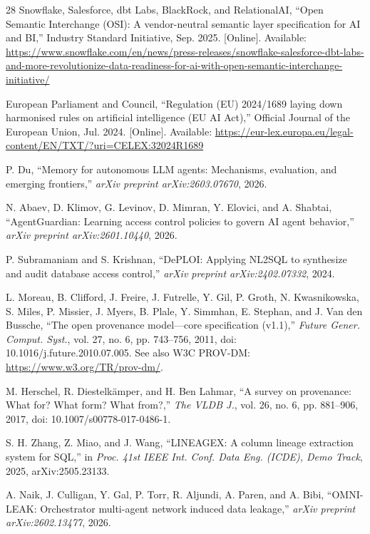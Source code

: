 \documentclass[nolineno]{ieeeaccess}
\begin{document}
\begin{thebibliography}{28}
Snowflake, Salesforce, dbt Labs, BlackRock, and RelationalAI, ``Open
Semantic Interchange (OSI): A vendor-neutral semantic layer specification
for AI and BI,'' Industry Standard Initiative, Sep. 2025. [Online].
Available:
\url{https://www.snowflake.com/en/news/press-releases/snowflake-salesforce-dbt-labs-and-more-revolutionize-data-readiness-for-ai-with-open-semantic-interchange-initiative/}

European Parliament and Council, ``Regulation (EU) 2024/1689 laying down
harmonised rules on artificial intelligence (EU AI Act),'' Official
Journal of the European Union, Jul. 2024. [Online]. Available:
\url{https://eur-lex.europa.eu/legal-content/EN/TXT/?uri=CELEX:32024R1689}

P. Du, ``Memory for autonomous LLM agents: Mechanisms, evaluation, and
emerging frontiers,'' \emph{arXiv preprint arXiv:2603.07670}, 2026.

N. Abaev, D. Klimov, G. Levinov, D. Mimran, Y. Elovici, and A. Shabtai,
``AgentGuardian: Learning access control policies to govern AI agent
behavior,'' \emph{arXiv preprint arXiv:2601.10440}, 2026.

P. Subramaniam and S. Krishnan, ``DePLOI: Applying NL2SQL to synthesize
and audit database access control,'' \emph{arXiv preprint
arXiv:2402.07332}, 2024.

L. Moreau, B. Clifford, J. Freire, J. Futrelle, Y. Gil, P. Groth,
N. Kwasnikowska, S. Miles, P. Missier, J. Myers, B. Plale, Y. Simmhan,
E. Stephan, and J. Van den Bussche, ``The open provenance model---core
specification (v1.1),'' \emph{Future Gener. Comput. Syst.}, vol. 27,
no. 6, pp. 743--756, 2011, doi: 10.1016/j.future.2010.07.005. See also
W3C PROV-DM: \url{https://www.w3.org/TR/prov-dm/}.

M. Herschel, R. Diestelk\"{a}mper, and H. Ben Lahmar, ``A survey on
provenance: What for? What form? What from?,'' \emph{The VLDB J.},
vol. 26, no. 6, pp. 881--906, 2017, doi: 10.1007/s00778-017-0486-1.

S. H. Zhang, Z. Miao, and J. Wang, ``LINEAGEX: A column lineage
extraction system for SQL,'' in \emph{Proc. 41st IEEE Int. Conf. Data
Eng. (ICDE), Demo Track}, 2025, arXiv:2505.23133.

A. Naik, J. Culligan, Y. Gal, P. Torr, R. Aljundi, A. Paren, and A. Bibi,
``OMNI-LEAK: Orchestrator multi-agent network induced data leakage,''
\emph{arXiv preprint arXiv:2602.13477}, 2026.


\end{thebibliography}
\end{document}
